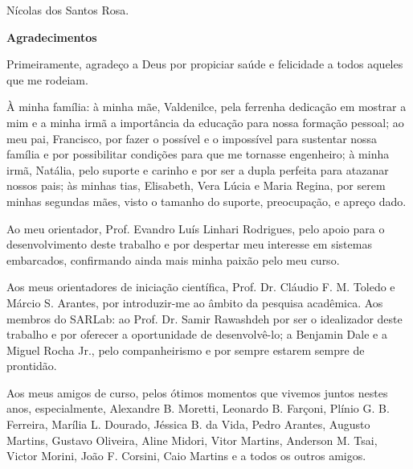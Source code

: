 \begin{flushright}
Nícolas dos Santos Rosa.
\end{flushright}

\cleardoublepage

\vspace{0.11\textheight} 

\begin{center}
\textbf{\Huge{Agradecimentos}}
\end{center}

\vspace{0.05\textheight}

Primeiramente, agradeço a Deus por propiciar saúde e felicidade a todos aqueles que me rodeiam.

À minha família: à minha mãe, Valdenilce, pela ferrenha dedicação em mostrar a mim e a minha irmã a importância da educação para nossa formação pessoal; ao meu pai, Francisco, por fazer o possível e o impossível para sustentar nossa família e por possibilitar condições para que me tornasse engenheiro; à minha irmã, Natália, pelo suporte e carinho e por ser a dupla perfeita para atazanar nossos pais; às minhas tias, Elisabeth, Vera Lúcia e Maria Regina, por serem minhas segundas mães, visto o tamanho do suporte, preocupação, e apreço dado. 

Ao meu orientador, Prof. Evandro Luís Linhari Rodrigues, pelo apoio para o desenvolvimento deste trabalho e por despertar meu interesse em sistemas embarcados, confirmando ainda mais minha paixão pelo meu curso.  

Aos meus orientadores de iniciação científica, Prof. Dr. Cláudio F. M. Toledo e Márcio S. Arantes, por introduzir-me ao âmbito da pesquisa acadêmica. Aos membros do SARLab: ao Prof. Dr. Samir Rawashdeh por ser o idealizador deste trabalho e por oferecer a oportunidade de desenvolvê-lo; a Benjamin Dale e a Miguel Rocha Jr., pelo companheirismo e por sempre estarem sempre de prontidão.

Aos meus amigos de curso, pelos ótimos momentos que vivemos juntos nestes anos, especialmente, Alexandre B. Moretti, Leonardo B. Farçoni, Plínio G. B. Ferreira, Marília L. Dourado,  Jéssica B. da Vida, Pedro Arantes, Augusto Martins, Gustavo Oliveira, Aline Midori, Vitor Martins, Anderson M. Tsai, Victor Morini, João F. Corsini, Caio Martins e a todos os outros amigos. 

